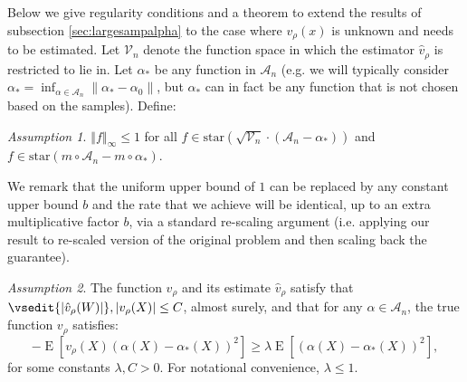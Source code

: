 \documentclass[aos]{imsart}
\numberwithin{equation}{section}
\theoremstyle{plain}
\theoremstyle{remark}
\newtheorem{assumption}{Assumption}
\newcommand{\C}[1]{\mathcal{#1}}
\DeclareMathOperator{\E}{E}
\begin{document}
Below we give regularity conditions and a theorem to extend the results of subsection \ref{sec:largesampalpha} to the case where $v_\rho(x)$ is unknown and needs to be estimated.  Let $\mathcal{V}_n$ denote the function space in which the estimator $\hat{v}_\rho$ is restricted to lie in. Let $\alpha_{\ast}$ be any function in $\C{A}_n$ (e.g. we will typically consider $\alpha_{\ast}=\inf_{\alpha\in \C{A}_n} \|\alpha_{\ast}-\alpha_0\|$, but $\alpha_{\ast}$ can in fact be any function that is not chosen based on the samples). Define:
\vsedit{\begin{align*}
{\mathrm{star}}(\sqrt{\mathcal{V}_n} \cdot (\mathcal{A}_n-\alpha_{*}))=~  &  \{w\rightarrow
\xi\,\sqrt{|v(w)|}\,(\alpha(x)-\alpha_{*}(x)):\alpha%
\in\mathcal{A}_n, v\in \mathcal{V}_n,\text{ }\xi\in\lbrack0,1]\}\\
{\mathrm{star}}(m\circ\mathcal{A}_n-m\circ\alpha_{*})=~  &
\{w\rightarrow\xi\,(m(W,\alpha)-m(W,\alpha_{*}%
)):\alpha\in\mathcal{A}_n,\text{ }\xi\in\lbrack0,1]\}
\end{align*}}
\begin{assumption}\label{ass2bis}
$\left\Vert f\right\Vert _{\infty}\leq1$ for all $f\in{\mathrm{star}}(\sqrt{\mathcal{V}_n} \cdot (\mathcal{A}_n-\alpha_{*}))$ and $f\in {\mathrm{star}}(m\circ\mathcal{A}_n-m\circ\alpha_{*})$.
\end{assumption}
We remark that the uniform upper bound of $1$ can be replaced by any constant upper bound $b$ and the rate that we achieve will be identical, up to an extra multiplicative factor $b$, via a standard re-scaling argument (i.e. applying our result to re-scaled version of the original problem and then scaling back the guarantee).
\begin{assumption}\label{ass3bis}
The function $v_\rho$ and its estimate $\hat{v}_\rho$ satisfy that $\vsedit{|\hat{v}_\rho(W)|}, |v_\rho(X)| \leq C$, almost surely, and that for any $\alpha \in \C{A}_n$, the true function $v_\rho$ satisfies:
\begin{equation}
-\E[v_\rho(X) (\alpha(X)-\alpha_{\ast}(X))^2] \geq \lambda \E[(\alpha(X)-\alpha_{\ast}(X))^2], \label{eqn:strong-conv}
\end{equation}
for some constants $\lambda, C>0$. For notational convenience, $\lambda \leq 1$.
\end{assumption}
\end{document}
